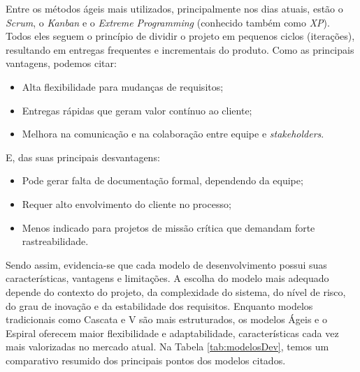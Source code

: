 \documentclass[english,brazilian]{UNISINOSartigo} %
\begin{document}
Entre os métodos ágeis mais utilizados, principalmente nos dias atuais, estão o \textit{Scrum}, o \textit{Kanban} e o \textit{Extreme Programming} (conhecido também como \textit{XP}). Todos eles seguem o princípio de dividir o projeto em pequenos ciclos (iterações), resultando em entregas frequentes e incrementais do produto. Como as principais vantagens, podemos citar:

\begin{itemize}[leftmargin=1cm, itemsep=0.1em, topsep=0.1em]
    \item Alta flexibilidade para mudanças de requisitos;
    \item Entregas rápidas que geram valor contínuo ao cliente;
    \item Melhora na comunicação e na colaboração entre equipe e \textit{stakeholders}.
\end{itemize}

E, das suas principais desvantagens:

\begin{itemize}[leftmargin=1cm, itemsep=0.1em, topsep=0.1em]
    \item Pode gerar falta de documentação formal, dependendo da equipe;
    \item Requer alto envolvimento do cliente no processo;
    \item Menos indicado para projetos de missão crítica que demandam forte rastreabilidade.
\end{itemize}

Sendo assim, evidencia-se que cada modelo de desenvolvimento possui suas características, vantagens e limitações. A escolha do modelo mais adequado depende do contexto do projeto, da complexidade do sistema, do nível de risco, do grau de inovação e da estabilidade dos requisitos. Enquanto modelos tradicionais como Cascata e V são mais estruturados, os modelos Ágeis e o Espiral oferecem maior flexibilidade e adaptabilidade, características cada vez mais valorizadas no mercado atual. Na Tabela \ref{tab:modelosDev}, temos um comparativo resumido dos principais pontos dos modelos citados.
\end{document}
